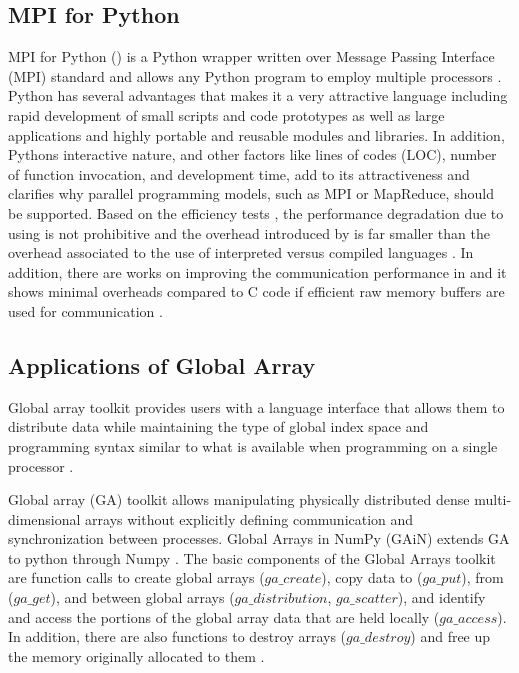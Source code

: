 \subsection{MPI for Python }
MPI for Python () is a Python wrapper written over Message Passing Interface (MPI) standard and allows any Python program to employ multiple processors \cite{Dalcin:2011aa, Dalcin:2005aa}.
Python has several advantages that makes it a very attractive language including rapid development of small scripts and code prototypes as well as large applications and highly portable and reusable modules and libraries.
In addition, Python\textsc{}s interactive nature, and other factors like lines of codes (LOC), number of function invocation, and development time, add to its attractiveness and clarifies why parallel programming models, such as MPI or MapReduce, should be supported.
Based on the efficiency tests \cite{Dalcin:2011aa, Dalcin:2005aa}, the performance degradation due to using  is not prohibitive and the overhead introduced by  is far smaller than the overhead associated to the use of interpreted versus compiled languages \cite{GAiN}.
In addition, there are works on improving the communication performance in  and it shows minimal overheads compared to C code if efficient raw memory buffers are used for communication \cite{Dalcin:2011aa}.

\subsection{Applications of Global Array}
Global array toolkit provides users with a language interface that allows them to distribute data while maintaining the type of global index space and programming syntax similar to what is available when programming on a single processor \cite{GA}.

Global array (GA) toolkit allows manipulating physically distributed dense multi-dimensional arrays without explicitly defining communication and synchronization between processes.
Global Arrays in NumPy (GAiN) extends GA to python through Numpy \cite{GAiN}. 
The basic components of the Global Arrays toolkit are function calls to create global arrays ($ga\_create$), copy data to ($ga\_put$), from ($ga\_get$), and between global arrays ($ga\_distribution$, $ga\_scatter$), and identify and access the portions of the global array data that are held locally ($ga\_access$). 
In addition, there are also functions to destroy arrays ($ga\_destroy$) and free up the memory originally allocated to them \cite{GAiN}.

